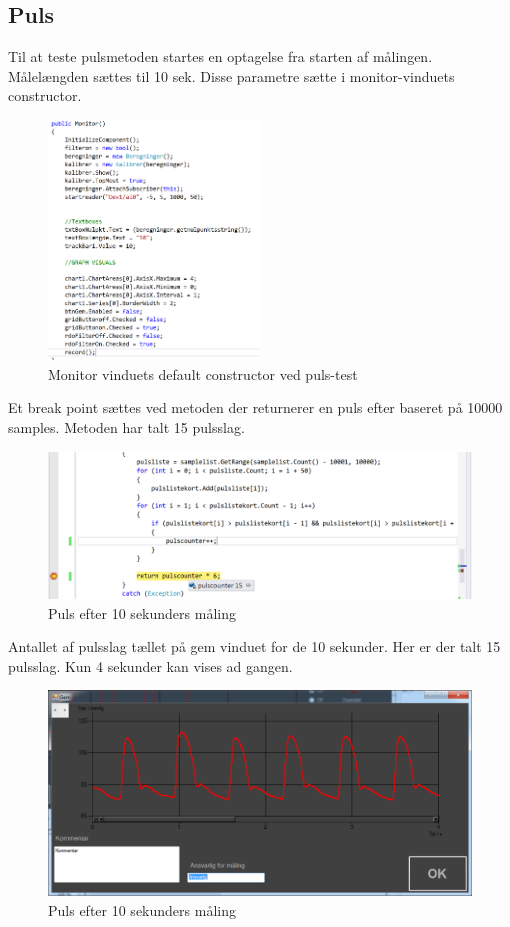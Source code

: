 \subsection{Puls}
Til at teste pulsmetoden startes en optagelse fra starten af målingen. Målelængden sættes til 10 sek. Disse parametre sætte i monitor-vinduets constructor.
\begin{figure}[H]
	\centering
	\includegraphics[width=0.5\textwidth]{Figurer/Pulstest_record}
	\caption{Monitor vinduets default constructor ved puls-test}
\end{figure}
Et break point sættes ved metoden der returnerer en puls efter baseret på 10000 samples. Metoden har talt 15 pulsslag.
\begin{figure}[H]
	\centering
	\includegraphics[width=1\textwidth]{Figurer/Pulstest_debug}
	\caption{Puls efter 10 sekunders måling}
\end{figure}
Antallet af pulsslag tællet på gem vinduet for de 10 sekunder. Her er der talt 15 pulsslag. Kun 4 sekunder kan vises ad gangen.
\begin{figure}[H]
	\centering
	\includegraphics[width=1\textwidth]{Figurer/Pulstest_gemmevindue}
	\caption{Puls efter 10 sekunders måling}
\end{figure}

